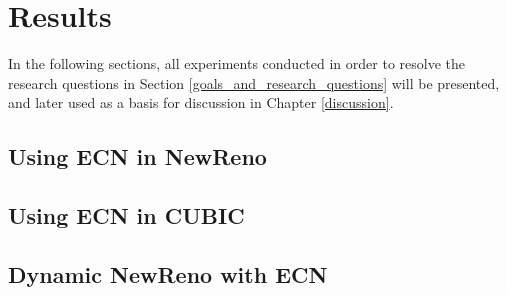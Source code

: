 \chapter{Results} \label{results}

In the following sections, all experiments conducted in order to resolve the research questions in Section \ref{goals_and_research_questions} will be presented, and later used as a basis for discussion in Chapter \ref{discussion}. 









\section{Using ECN in NewReno}

\todo{}












\section{Using ECN in CUBIC}

\todo{}









\section{Dynamic NewReno with ECN}


